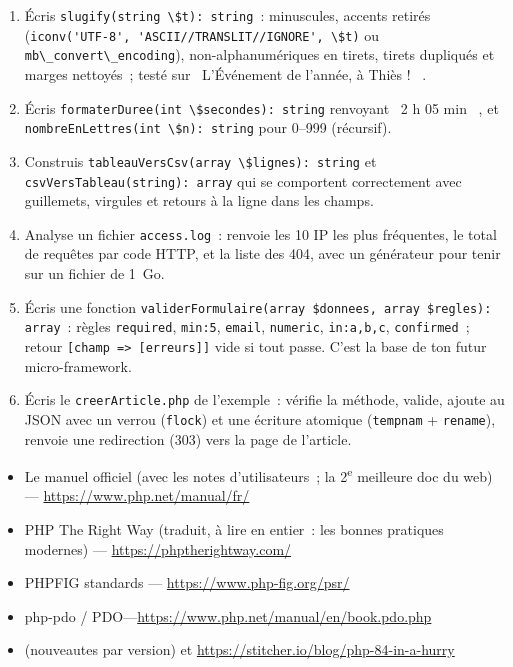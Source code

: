\begin{exercice}
\begin{enumerate}
  \item \'Ecris \verb|slugify(string \$t): string|~: minuscules, accents retir\'es
        (\verb|iconv('UTF-8', 'ASCII//TRANSLIT//IGNORE', \$t)| ou \verb|mb\_convert\_encoding|),
        non-alphanum\'eriques en tirets, tirets dupliqu\'es et marges nettoy\'es~; test\'e sur
        \og ~L'\'Ev\'enement de l'ann\'ee, \`a Thi\`es !~ \fg{}.
  \item \'Ecris \verb|formaterDuree(int \$secondes): string| renvoyant \og ~2 h 05 min~ \fg{}, et
        \verb|nombreEnLettres(int \$n): string| pour 0--999 (r\'ecursif).
  \item Construis \verb|tableauVersCsv(array \$lignes): string| et \verb|csvVersTableau(string): array|
        qui se comportent correctement avec guillemets, virgules et retours \`a la ligne dans les champs.
  \item Analyse un fichier \verb|access.log|~: renvoie les 10 IP les plus fr\'equentes, le total de
        requ\^etes par code HTTP, et la liste des 404, avec un g\'en\'erateur pour tenir sur un fichier
        de 1~Go.
  \item \'Ecris une fonction \verb|validerFormulaire(array $donnees, array $regles): array|~: r\`egles
        \verb|required|, \verb|min:5|, \verb|email|, \verb|numeric|, \verb|in:a,b,c|,
        \verb|confirmed|~; retour \verb|[champ => [erreurs]]| vide si tout passe. C'est la base
        de ton futur micro-framework.
  \item \'Ecris le \verb|creerArticle.php| de l'exemple~: v\'erifie la m\'ethode, valide, ajoute au JSON
        avec un verrou (\verb|flock|) et une \'ecriture atomique (\verb|tempnam| + \verb|rename|),
        renvoie une redirection (303) vers la page de l'article.
\end{enumerate}
\end{exercice}

\begin{ressources}
\begin{itemize}
  \item Le manuel officiel (avec les notes d'utilisateurs~; la 2\textsuperscript{e} meilleure doc du web) --- \url{https://www.php.net/manual/fr/}
  \item PHP The Right Way (traduit, \`a lire en entier~: les bonnes pratiques modernes) --- \url{https://phptherightway.com/}
  \item PHPFIG standards --- \url{https://www.php-fig.org/psr/}
  \item php-pdo / PDO---\url{https://www.php.net/manual/en/book.pdo.php}
  \item {} (nouveautes par version) et \url{https://stitcher.io/blog/php-84-in-a-hurry}
\end{itemize}
\end{ressources}

